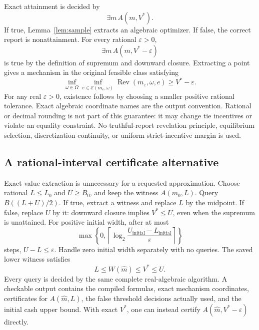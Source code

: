 \documentclass[11pt,a4paper]{article}
\numberwithin{equation}{section}
\theoremstyle{definition}
\newcommand{\cE}{\mathcal E}
\DeclareMathOperator{\Rev}{Rev}
\begin{document}
Exact attainment is decided by
\begin{equation}\label{eq:attainment}
 \exists m\,A(m,V^*).
\end{equation}
If true, Lemma~\ref{lem:sample} extracts an algebraic optimizer.
If false, the correct report is nonattainment.
For every rational \(\varepsilon>0\),
\begin{equation}\label{eq:epsilon}
 \exists m\,A(m,V^*-\varepsilon)
\end{equation}
is true by the definition of supremum and downward closure.
Extracting a point gives a mechanism in the original feasible
class satisfying
\[
 \inf_{\omega\in\Omega}\inf_{e\in\cE(m_\varepsilon,\omega)}
       \Rev(m_\varepsilon,\omega,e)\ge V^*-\varepsilon.
\]
For any real \(\varepsilon>0\), existence follows by choosing a
smaller positive rational tolerance.
Exact algebraic coordinate names are the output convention.
Rational or decimal rounding is not part of this guarantee:
it may change tie incentives or violate an equality constraint.
No truthful-report revelation principle, equilibrium selection,
discretization continuity, or uniform strict-incentive margin is used.

\subsection{A rational-interval certificate alternative}
Exact value extraction is unnecessary for a requested approximation.
Choose rational \(L\le L_0\) and \(U\ge B_0\), and keep the witness
\(A(m_0,L)\).
Query \(B((L+U)/2)\). If true, extract a witness and replace \(L\)
by the midpoint. If false, replace \(U\) by it: downward closure
implies \(V^*\le U\), even when the supremum is unattained.
For positive initial width, after at most
\begin{equation}\label{eq:bisection}
 \max\left\{0,
   \left\lceil\log_2\frac{U_{\mathrm{initial}}-L_{\mathrm{initial}}}
                            {\varepsilon}\right\rceil\right\}
\end{equation}
steps, \(U-L\le\varepsilon\).
Handle zero initial width separately with no queries.
The saved lower witness satisfies
\[
 L\le W(\widehat m)\le V^*\le U.
\]
Every query is decided by the same complete real-algebraic algorithm.
A checkable output contains the compiled formulas, exact mechanism
coordinates, certificates for \(A(\widehat m,L)\), the false threshold
decisions actually used, and the initial cash upper bound.
With exact \(V^*\), one can instead certify
\(A(\widehat m,V^*-\varepsilon)\) directly.
\end{document}
